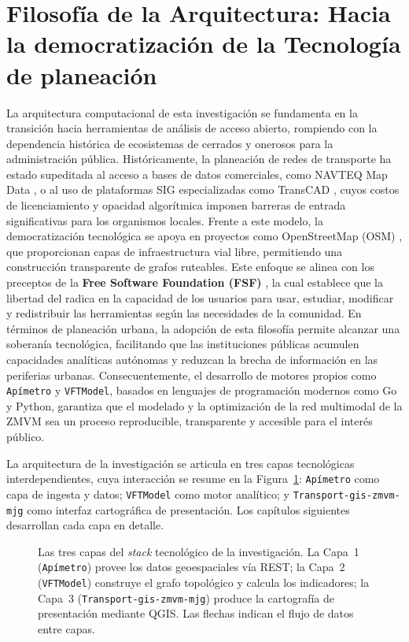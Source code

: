 
\section{Filosofía de la Arquitectura: Hacia la democratización de la Tecnología de planeación}
\label{sec:filosofia-arquitectura}

La arquitectura computacional de esta investigación se fundamenta en la
transición hacia herramientas de análisis de acceso abierto, rompiendo con la
dependencia histórica de ecosistemas de  cerrados y onerosos para la
administración pública. Históricamente, la planeación de redes de transporte ha
estado supeditada al acceso a bases de datos comerciales, como NAVTEQ Map Data
\citep{navteq2012}, o al uso de plataformas SIG especializadas como TransCAD
\citep{caliper2010}, cuyos costos de licenciamiento y opacidad algorítmica
imponen barreras de entrada significativas para los organismos locales. Frente a
este modelo, la democratización tecnológica se apoya en proyectos como
OpenStreetMap (OSM) \citep{osm2012}, que proporcionan capas de infraestructura
vial libre, permitiendo una construcción transparente de grafos ruteables. Este
enfoque se alinea con los preceptos de la
\textbf{Free Software Foundation (FSF)} \citep{fsf2026}, la cual establece que la libertad del
 radica en la capacidad de los usuarios para usar, estudiar, modificar y
redistribuir las herramientas según las necesidades de la comunidad. En términos
de planeación urbana, la adopción de esta filosofía permite alcanzar una
soberanía tecnológica, facilitando que las instituciones públicas acumulen
capacidades analíticas autónomas y reduzcan la brecha de información en las
periferias urbanas. Consecuentemente, el desarrollo de motores propios como
\texttt{Apímetro} y \texttt{VFTModel}, basados en lenguajes de programación
modernos como Go y Python, garantiza que el modelado y la optimización de la red
multimodal de la ZMVM sea un proceso reproducible, transparente y accesible para
el interés público.

La arquitectura de la investigación se articula en tres capas tecnológicas
interdependientes, cuya interacción se resume en la
Figura~\ref{fig:macro-arquitectura-stack}: \texttt{Apímetro} como capa de ingesta y
datos; \texttt{VFTModel} como motor analítico; y
\texttt{Transport-gis-zmvm-mjg} como interfaz cartográfica de presentación. Los
capítulos siguientes desarrollan cada capa en detalle.

\begin{figure}[H]
    \centering
    
    \caption[Macro-arquitectura del \textit{stack} tecnológico de la investigación]{
    Las tres capas del \textit{stack} tecnológico de la investigación. La Capa~1
    (\texttt{Apímetro}) provee los datos geoespaciales vía \api{} REST; la Capa~2
    (\texttt{VFTModel}) construye el grafo topológico y calcula los indicadores; la
    Capa~3 (\texttt{Transport-gis-zmvm-mjg}) produce la cartografía de presentación mediante QGIS.
    Las flechas indican el flujo de datos entre capas.}
    \label{fig:macro-arquitectura-stack}
\end{figure}
